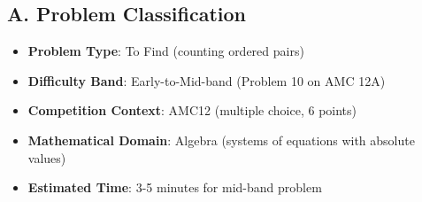 \documentclass[]{article}
\begin{document}
\begin{problemconfigbox}
\subsection*{A. Problem Classification}
\begin{itemize}[leftmargin=*]
    \item \textbf{Problem Type}: To Find (counting ordered pairs)
    \item \textbf{Difficulty Band}: Early-to-Mid-band (Problem 10 on AMC 12A)
    \item \textbf{Competition Context}: AMC12 (multiple choice, 6 points)
    \item \textbf{Mathematical Domain}: Algebra (systems of equations with absolute values)
    \item \textbf{Estimated Time}: 3-5 minutes for mid-band problem
\end{itemize}


\end{problemconfigbox}
\end{document}
